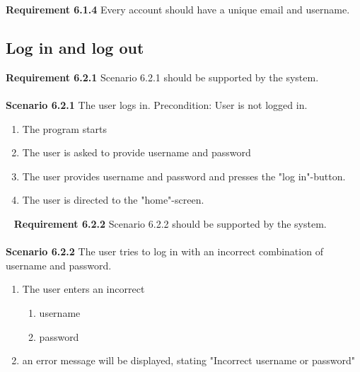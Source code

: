 \documentclass{article}
\begin{document}
\textbf{Requirement 6.1.4} Every account should have a unique email and username.

\subsection{Log in and log out}
\textbf{Requirement 6.2.1} Scenario 6.2.1 should be supported by the system.
\\ \\
\textbf{Scenario 6.2.1} The user logs in. Precondition: User is not logged in. 
\begin{enumerate}
    \item The program starts
    \item The user is asked to provide username and password
    \item The user provides username and password and presses the "log in"-button.
    \item The user is directed to the "home"-screen.
\end{enumerate}
\mbox{}\
\textbf{Requirement 6.2.2} Scenario 6.2.2 should be supported by the system.
\\ \\
\textbf{Scenario 6.2.2} The user tries to log in with an incorrect combination of username and password.
\begin{enumerate}
    \item The user enters an incorrect
    \begin{enumerate}[label=(\alph*)]
        \item username
        \item password
    \end{enumerate}
    \item an error message will be displayed, stating "Incorrect username or password"
\end{enumerate}
\mbox{}\\ \\
\end{document}
